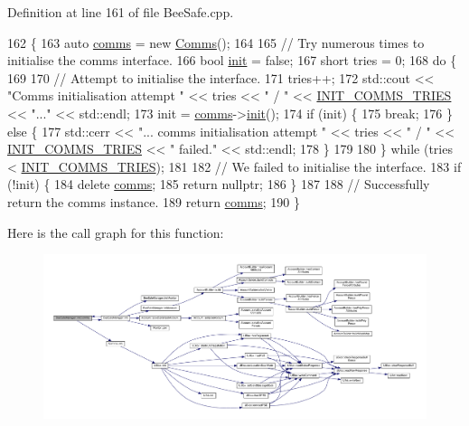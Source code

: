 Definition at line 161 of file Bee\+Safe.\+cpp.


\begin{DoxyCode}
162 \{
163     \textcolor{keyword}{auto} \hyperlink{class_bee_safe_manager_a80b19afbb679d08be14d67a45447f9e1}{comms} = \textcolor{keyword}{new} \hyperlink{class_comms}{Comms}();
164 
165     \textcolor{comment}{// Try numerous times to initialise the comms interface.}
166     \textcolor{keywordtype}{bool} \hyperlink{class_bee_safe_manager_a2f16b09c454e21c887d14ac5483973cf}{init} = \textcolor{keyword}{false};
167     \textcolor{keywordtype}{short} tries = 0;
168     \textcolor{keywordflow}{do} \{
169 
170         \textcolor{comment}{// Attempt to initialise the interface.}
171         tries++;
172         std::cout << \textcolor{stringliteral}{"Comms initialisation attempt "} << tries << \textcolor{stringliteral}{" / "} << 
      \hyperlink{_bee_safe_8cpp_aa5860d80bbb4527d5d2275aacfce65f7}{INIT\_COMMS\_TRIES} << \textcolor{stringliteral}{"..."} <<  std::endl;
173         init = \hyperlink{class_bee_safe_manager_a80b19afbb679d08be14d67a45447f9e1}{comms}->\hyperlink{class_comms_aa0519d3ed2d5bd6aad60101080ac2de7}{init}();
174         \textcolor{keywordflow}{if} (init) \{
175             \textcolor{keywordflow}{break};
176         \} \textcolor{keywordflow}{else} \{
177             std::cerr << \textcolor{stringliteral}{"... comms initialisation attempt "} << tries << \textcolor{stringliteral}{" / "} << 
      \hyperlink{_bee_safe_8cpp_aa5860d80bbb4527d5d2275aacfce65f7}{INIT\_COMMS\_TRIES} << \textcolor{stringliteral}{" failed."} << std::endl;
178         \}
179 
180     \} \textcolor{keywordflow}{while} (tries < \hyperlink{_bee_safe_8cpp_aa5860d80bbb4527d5d2275aacfce65f7}{INIT\_COMMS\_TRIES});
181 
182     \textcolor{comment}{// We failed to initialise the interface.}
183     \textcolor{keywordflow}{if} (!init) \{
184         \textcolor{keyword}{delete} \hyperlink{class_bee_safe_manager_a80b19afbb679d08be14d67a45447f9e1}{comms};
185         \textcolor{keywordflow}{return} \textcolor{keyword}{nullptr};
186     \}
187 
188     \textcolor{comment}{// Successfully return the comms instance.}
189     \textcolor{keywordflow}{return} \hyperlink{class_bee_safe_manager_a80b19afbb679d08be14d67a45447f9e1}{comms};
190 \}
\end{DoxyCode}
Here is the call graph for this function\+:
\nopagebreak
\begin{figure}[H]
\begin{center}
\leavevmode
\includegraphics[width=350pt]{d5/d75/class_bee_safe_manager_a28306d7ccf7136a6086d666f4ebb6566_cgraph}
\end{center}
\end{figure}
